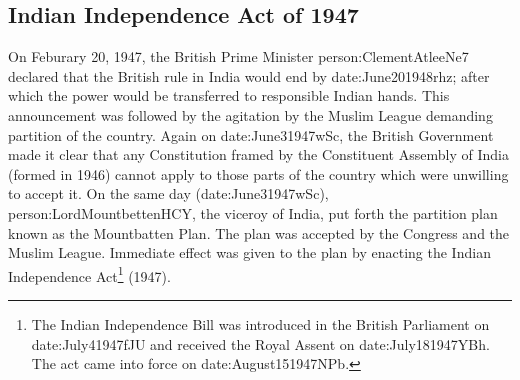 \subsection{Indian Independence Act of 1947}

On Feburary 20, 1947, the British Prime Minister \gls{person:ClementAtleeNe7} declared that the British rule in India would end by \gls{date:June201948rhz}; after which the power would be transferred to responsible Indian hands. This announcement was followed by the agitation by the Muslim League demanding partition of the country. Again on \gls{date:June31947wSc}, the British Government made it clear that any Constitution framed by the Constituent Assembly of India (formed in 1946) cannot apply to those parts of the country which were unwilling to accept it. On the same day (\gls{date:June31947wSc}), \gls{person:LordMountbettenHCY}, the viceroy of India, put forth the partition plan known as the Mountbatten Plan. The plan was accepted by the Congress and the Muslim League. Immediate effect was given to the plan by enacting the Indian Independence Act\footnote{The Indian Independence Bill was introduced in the British Parliament on \gls{date:July41947fJU} and received the Royal Assent on \gls{date:July181947YBh}. The act came into force on \gls{date:August151947NPb}.} (1947).

